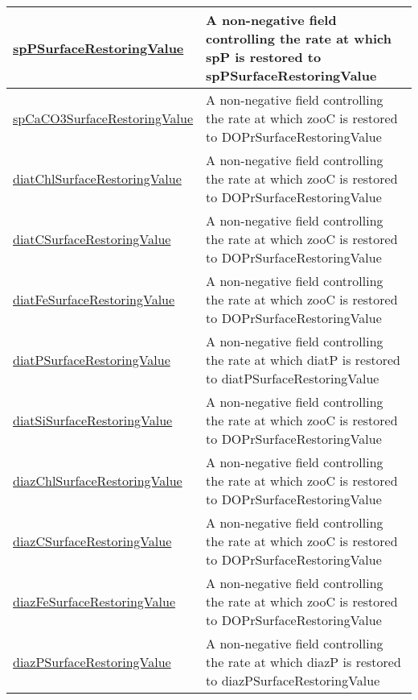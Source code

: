 {\begin{center}
\begin{longtable}{| p{2.0in} | p{4.0in} |}
    \hline
    \hyperref[subsec:var_sec_forcing_spPSurfaceRestoringValue]{spPSurfaceRestoringValue} & A non-negative field controlling the rate at which spP is restored to spPSurfaceRestoringValue \\
    \hline
    \hyperref[subsec:var_sec_forcing_spCaCO3SurfaceRestoringValue]{spCaCO3SurfaceRestoringValue} & A non-negative field controlling the rate at which zooC is restored to DOPrSurfaceRestoringValue \\
    \hline
    \hyperref[subsec:var_sec_forcing_diatChlSurfaceRestoringValue]{diatChlSurfaceRestoringValue} & A non-negative field controlling the rate at which zooC is restored to DOPrSurfaceRestoringValue \\
    \hline
    \hyperref[subsec:var_sec_forcing_diatCSurfaceRestoringValue]{diatCSurfaceRestoringValue} & A non-negative field controlling the rate at which zooC is restored to DOPrSurfaceRestoringValue \\
    \hline
    \hyperref[subsec:var_sec_forcing_diatFeSurfaceRestoringValue]{diatFeSurfaceRestoringValue} & A non-negative field controlling the rate at which zooC is restored to DOPrSurfaceRestoringValue \\
    \hline
    \hyperref[subsec:var_sec_forcing_diatPSurfaceRestoringValue]{diatPSurfaceRestoringValue} & A non-negative field controlling the rate at which diatP is restored to diatPSurfaceRestoringValue \\
    \hline
    \hyperref[subsec:var_sec_forcing_diatSiSurfaceRestoringValue]{diatSiSurfaceRestoringValue} & A non-negative field controlling the rate at which zooC is restored to DOPrSurfaceRestoringValue \\
    \hline
    \hyperref[subsec:var_sec_forcing_diazChlSurfaceRestoringValue]{diazChlSurfaceRestoringValue} & A non-negative field controlling the rate at which zooC is restored to DOPrSurfaceRestoringValue \\
    \hline
    \hyperref[subsec:var_sec_forcing_diazCSurfaceRestoringValue]{diazCSurfaceRestoringValue} & A non-negative field controlling the rate at which zooC is restored to DOPrSurfaceRestoringValue \\
    \hline
    \hyperref[subsec:var_sec_forcing_diazFeSurfaceRestoringValue]{diazFeSurfaceRestoringValue} & A non-negative field controlling the rate at which zooC is restored to DOPrSurfaceRestoringValue \\
    \hline
    \hyperref[subsec:var_sec_forcing_diazPSurfaceRestoringValue]{diazPSurfaceRestoringValue} & A non-negative field controlling the rate at which diazP is restored to diazPSurfaceRestoringValue \\

\end{longtable}
\end{center}}
